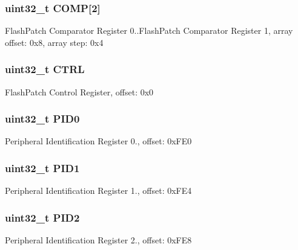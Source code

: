\subsubsection[{C\+O\+M\+P}]{\setlength{\rightskip}{0pt plus 5cm}uint32\+\_\+t C\+O\+M\+P\mbox{[}2\mbox{]}}\label{struct_b_p___mem_map_afb7d1b290d30b9254c6975be8cfafbd7}
Flash\+Patch Comparator Register 0..Flash\+Patch Comparator Register 1, array offset\+: 0x8, array step\+: 0x4 \hypertarget{struct_b_p___mem_map_a3be6514ca3bd369fd0de9f8f49471179}{}
\subsubsection[{C\+T\+R\+L}]{\setlength{\rightskip}{0pt plus 5cm}uint32\+\_\+t C\+T\+R\+L}\label{struct_b_p___mem_map_a3be6514ca3bd369fd0de9f8f49471179}
Flash\+Patch Control Register, offset\+: 0x0 \hypertarget{struct_b_p___mem_map_a769a58cfc13da35629a0e87f06abf754}{}
\subsubsection[{P\+I\+D0}]{\setlength{\rightskip}{0pt plus 5cm}uint32\+\_\+t P\+I\+D0}\label{struct_b_p___mem_map_a769a58cfc13da35629a0e87f06abf754}
Peripheral Identification Register 0., offset\+: 0x\+F\+E0 \hypertarget{struct_b_p___mem_map_a6e66209ba976b8d677c86ee05f0ee2fa}{}
\subsubsection[{P\+I\+D1}]{\setlength{\rightskip}{0pt plus 5cm}uint32\+\_\+t P\+I\+D1}\label{struct_b_p___mem_map_a6e66209ba976b8d677c86ee05f0ee2fa}
Peripheral Identification Register 1., offset\+: 0x\+F\+E4 \hypertarget{struct_b_p___mem_map_a8c56863ae2fd45dbee06b0ba0c7c17c7}{}
\subsubsection[{P\+I\+D2}]{\setlength{\rightskip}{0pt plus 5cm}uint32\+\_\+t P\+I\+D2}\label{struct_b_p___mem_map_a8c56863ae2fd45dbee06b0ba0c7c17c7}
Peripheral Identification Register 2., offset\+: 0x\+F\+E8 \hypertarget{struct_b_p___mem_map_acf224ed0d83cc1ae7b8492c6cd79e5dd}{}

